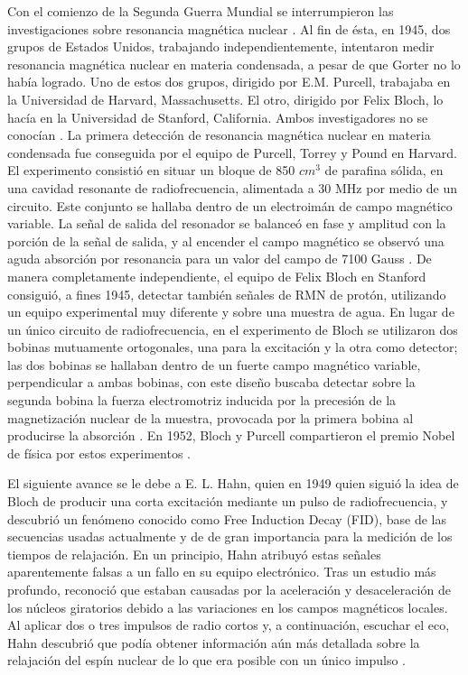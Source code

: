 Con el comienzo de la Segunda Guerra Mundial se interrumpieron las investigaciones sobre resonancia magnética nuclear \cite{Canals_2008,Luiten2003}. Al fin de ésta, en 1945, dos grupos de Estados Unidos, trabajando independientemente, intentaron  medir resonancia magnética nuclear en materia condensada, a pesar de que Gorter no lo había logrado. Uno de estos dos grupos, dirigido por E.M. Purcell, trabajaba en la Universidad de Harvard, Massachusetts. El otro, dirigido por Felix Bloch, lo hacía en la Universidad de Stanford, California. Ambos investigadores no se conocían \cite{Luiten2003}. La primera detección de resonancia magnética nuclear en materia condensada fue conseguida por el equipo de Purcell, Torrey y Pound en Harvard. El experimento consistió en situar un bloque de 850 $cm^3$ de parafina sólida, en una cavidad resonante de radiofrecuencia, alimentada a 30 MHz por medio de un circuito. Este conjunto se hallaba dentro de un electroimán de campo magnético variable. La señal de salida del resonador se balanceó en fase y amplitud con la porción de la señal de salida, y al encender el campo magnético se observó una aguda absorción por resonancia para un valor del campo de 7100 Gauss \cite{Purcell1946}. De manera completamente independiente, el equipo de Felix Bloch en Stanford consiguió, a fines 1945, detectar también señales de RMN de protón, utilizando un equipo experimental muy diferente y sobre una muestra de agua. En lugar de un único circuito de radiofrecuencia, en el experimento de Bloch se utilizaron dos bobinas mutuamente ortogonales, una para la excitación y la otra como detector; las dos bobinas se hallaban dentro de un fuerte campo magnético variable, perpendicular a ambas bobinas, con este diseño buscaba detectar sobre la segunda bobina la fuerza electromotriz inducida por la precesión de la magnetización nuclear de la muestra, provocada por la primera bobina al producirse la absorción \cite{Bloch1946}. En 1952, Bloch y Purcell compartieron el premio Nobel de física por estos experimentos \cite{Detre2007}.

El siguiente avance se le debe a E. L. Hahn, quien en 1949 quien siguió la idea de Bloch de producir una corta excitación mediante un pulso de radiofrecuencia, y descubrió un fenómeno conocido como Free Induction Decay (FID), base de las secuencias usadas actualmente y de  de gran importancia para la medición de los tiempos de relajación. En un principio, Hahn atribuyó estas señales aparentemente falsas a un fallo en su equipo electrónico. Tras un estudio más profundo, reconoció que estaban causadas por la aceleración y desaceleración de los núcleos giratorios debido a las variaciones en los campos magnéticos locales. Al aplicar dos o tres impulsos de radio cortos y, a continuación, escuchar el eco, Hahn descubrió que podía obtener información aún más detallada sobre la relajación del espín nuclear de lo que era posible con un único impulso \cite{Canals_2008}.

